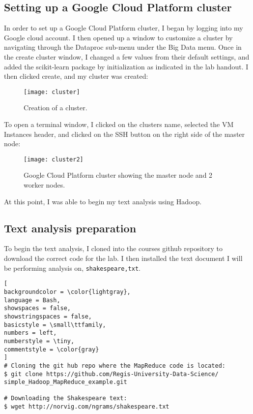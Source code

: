 \documentclass[]{article}
\newcommand{\code}[1]{\colorbox{light-gray}{\texttt{#1}}}
\begin{document}
\subsection{Setting up a Google Cloud Platform cluster}
In order to set up a Google Cloud Platform cluster, I began by logging into my Google cloud account.  I then opened up a window to customize a cluster by navigating through the Dataproc sub-menu under the Big Data menu. Once in the create cluster window, I changed a few values from their default settings, and added the scikit-learn package by initialization as indicated in the lab handout.  I then clicked create, and my cluster was created:
\pagebreak
\begin{figure}[!h]
	\texttt{[image: cluster]}
	\caption{Creation of a cluster.}
	\label{Fig:Race}
\end{figure}

To open a terminal window, I clicked on the clusters name, selected the VM Instances header, and clicked on the SSH button on the right side of the master node:

\begin{figure}[!h]
	\texttt{[image: cluster2]}
	\caption{Google Cloud Platform cluster showing the master node and 2 worker nodes.}
	\label{Fig:Race}
\end{figure}

At this point, I was able to begin my text analysis using Hadoop.

\subsection{Text analysis preparation}
To begin the text analysis, I cloned into the courses github repository to download the correct code for the lab.  I then installed the text document I will be performing analysis on, \code{shakespeare,txt}.

\begin{lstlisting}[
backgroundcolor = \color{lightgray},
language = Bash,
showspaces = false,
showstringspaces = false,
basicstyle = \small\ttfamily,
numbers = left,
numberstyle = \tiny,
commentstyle = \color{gray}
]
# Cloning the git hub repo where the MapReduce code is located:
$ git clone https://github.com/Regis-University-Data-Science/
simple_Hadoop_MapReduce_example.git

# Downloading the Shakespeare text:
$ wget http://norvig.com/ngrams/shakespeare.txt
\end{lstlisting}
\end{document}
